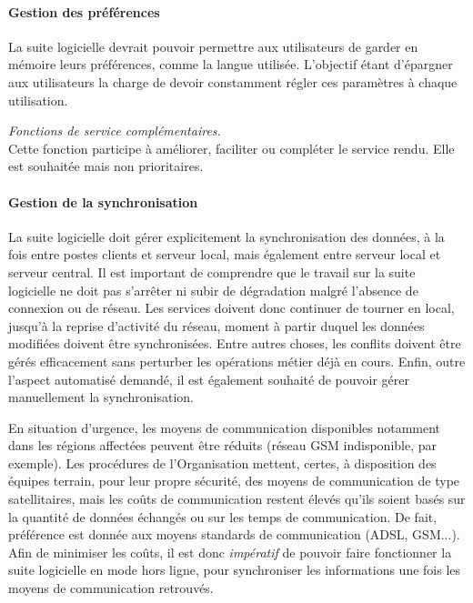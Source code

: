 \paragraph{Gestion des préférences}
La suite logicielle devrait pouvoir permettre aux utilisateurs de garder en mémoire leurs préférences, comme la langue utilisée. L'objectif étant d'épargner aux utilisateurs la charge de devoir constamment régler ces paramètres à chaque utilisation.
\begin{notation}
\emph{Fonctions de service complémentaires.}
\\
Cette fonction participe à améliorer, faciliter ou compléter le service rendu. Elle est souhaitée mais non prioritaires.
\end{notation}

\paragraph{Gestion de la synchronisation}
La suite logicielle doit gérer explicitement la synchronisation des données, à la fois entre postes clients et serveur local, mais également entre serveur local et serveur central. Il est important de comprendre que le travail sur la suite logicielle ne doit pas s'arrêter ni subir de dégradation malgré l'absence de connexion ou de réseau. Les services doivent donc continuer de tourner en local, jusqu'à la reprise d'activité du réseau, moment à partir duquel les données modifiées doivent être synchronisées. Entre autres choses, les conflits doivent être gérés efficacement sans perturber les opérations métier déjà en cours. Enfin, outre l'aspect automatisé demandé, il est également souhaité de pouvoir gérer manuellement la synchronisation.
\begin{constraint}
En situation d'urgence, les moyens de communication disponibles notamment dans les régions affectées peuvent être \og{}réduits\fg{} (réseau GSM indisponible, par exemple). Les procédures de l'Organisation mettent, certes, à disposition des équipes terrain, pour leur propre sécurité, des moyens de communication de type satellitaires, mais les coûts de communication restent élevés qu'ils soient basés sur la quantité de données échangés ou sur les temps de communication. De fait, préférence est donnée aux moyens \og{}standards\fg{} de communication (ADSL, GSM...). Afin de minimiser les coûts, il est donc \emph{impératif} de pouvoir faire fonctionner la suite logicielle en mode \og{}hors ligne\fg{}, pour synchroniser les informations une fois les moyens de communication retrouvés.
\end{constraint}

